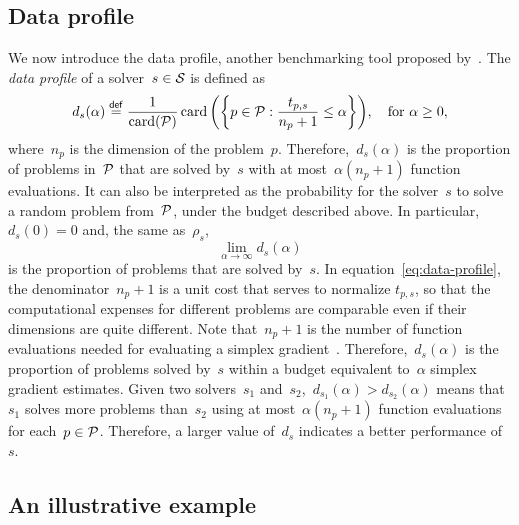 \subsection{Data profile}

We now introduce the data profile, another benchmarking tool proposed by~\cite{More_Wild_2009}.
The \emph{data profile} of a solver~$s \in \mathcal{S}$ is defined as
\begin{equation}
    \label{eq:data-profile}
    d_s(\alpha) \eqdef \frac{1}{\card(\xpb)} \card \bigg(\set[\bigg]{p \in \xpb : \frac{t_{p, s}}{n_p + 1} \le \alpha}\bigg), \quad \text{for~$\alpha \ge 0$},
\end{equation}
where~$n_p$ is the dimension of the problem~$p$.
Therefore,~$d_s(\alpha)$ is the proportion of problems in~$\mathcal{P}$ that are solved by~$s$ with at most~$\alpha (n_p + 1)$ function evaluations.
It can also be interpreted as the probability for the solver~$s$ to solve a random problem from~$\mathcal{P}$, under the budget described above.
In particular,~$d_s(0) = 0$ and, the same as~$\rho_s$,
\begin{equation*}
    \lim_{\alpha \to \infty} d_s(\alpha)
\end{equation*}
is the proportion of problems that are solved by~$s$.
In equation~\cref{eq:data-profile}, the denominator~$n_p + 1$ is a unit cost that serves to normalize $t_{p, s}$, so that the computational expenses for different problems are comparable even if their dimensions are quite different.
Note that~$n_p + 1$ is the number of function evaluations needed for evaluating a simplex gradient~\cite{Bortz_Kelley_1998}.
Therefore,~$d_s(\alpha)$ is the proportion of problems solved by~$s$ within a budget equivalent to~$\alpha$ simplex gradient estimates.
Given two solvers~$s_1$ and~$s_2$,~$d_{s_1}(\alpha) > d_{s_2}(\alpha)$ means that~$s_1$ solves more problems than~$s_2$ using at most~$\alpha (n_p + 1)$ function evaluations for each~$p \in \mathcal{P}$.
Therefore, a larger value of~$d_s$ indicates a better performance of~$s$.

\subsection{An illustrative example}

